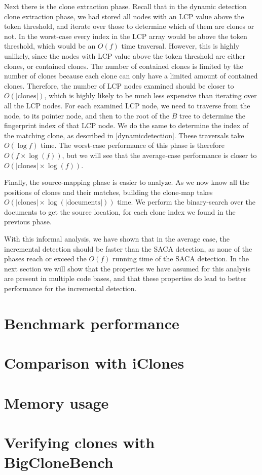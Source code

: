 Next there is the clone extraction phase. Recall that in the dynamic detection clone
extraction phase, we had stored all nodes with an LCP value above the token threshold, and
iterate over those to determine which of them are clones or not. In the worst-case every
index in the LCP array would be above the token threshold, which would be an $O(f)$ time
traversal. However, this is highly unlikely, since the nodes with LCP value above the
token threshold are either clones, or contained clones. The number of contained clones is
limited by the number of clones because each clone can only have a limited amount of
contained clones. Therefore, the number of LCP nodes examined should be closer to
$O(\vert\text{clones}\vert)$, which is highly likely to be much less expensive than
iterating over all the LCP nodes. For each examined LCP node, we need to traverse from the
node, to its pointer node, and then to the root of the $B$ tree to determine the
fingerprint index of that LCP node. We do the same to determine the index of the matching
clone, as described in \cref{dynamicdetection}. These traversals take $O(\log f)$ time.
The worst-case performance of this phase is therefore $O(f \times \log(f))$, but we will
see that the average-case performance is closer to $O(\vert\text{clones}\vert \times
\log(f))$.

Finally, the source-mapping phase is easier to analyze. As we now know all the positions
of clones and their matches, building the clone-map takes $O(\vert\text{clones}\vert
\times \log(\vert\text{documents}\vert))$ time. We perform the binary-search over the
documents to get the source location, for each clone index we found in the previous phase.

With this informal analysis, we have shown that in the average case, the incremental
detection should be faster than the SACA detection, as none of the phases reach or exceed
the $O(f)$ running time of the SACA detection. In the next section we will show that the
properties we have assumed for this analysis are present in multiple code bases, and that
these properties do lead to better performance for the incremental detection.


\section{Benchmark performance}



\section{Comparison with iClones}

\section{Memory usage}

\section{Verifying clones with BigCloneBench}
